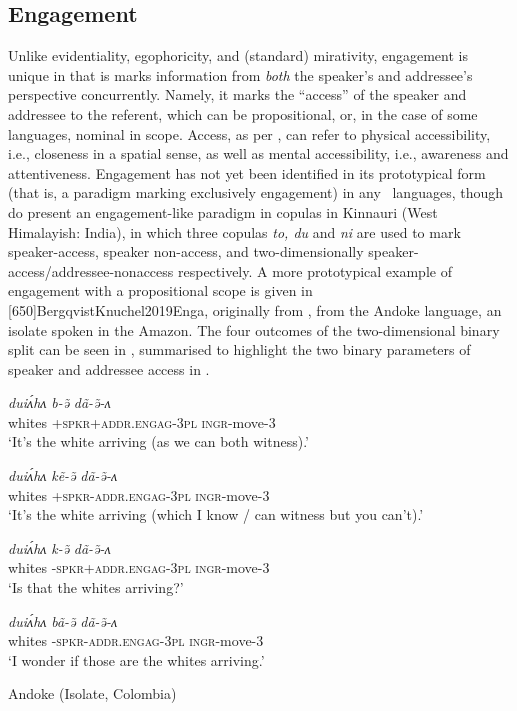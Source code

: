 \subsection{Engagement}\label{s:Intro:EngagementIntro}
Unlike evidentiality, egophoricity, and (standard) mirativity, engagement is unique in that is marks information from \textit{both} the speaker's and addressee's perspective concurrently. Namely, it marks the ``access'' \cite[118]{EvansBergqvistSanRoque2018a} of the speaker and addressee to the referent, which can be propositional, or, in the case of some languages, nominal in scope. Access, as per , can refer to physical accessibility, i.e., closeness in a spatial sense, as well as mental accessibility, i.e., awareness and attentiveness. Engagement has not yet been identified in its prototypical form (that is, a paradigm marking exclusively engagement) in any \lfam\ languages, though  do present an engagement-like paradigm in copulas in Kinnauri (West Himalayish: India), in which three copulas \textit{to, du} and \textit{ni} are used to mark speaker-access, speaker non-access, and two-dimensionally speaker-access/addressee-nonaccess respectively. A more prototypical example of engagement with a propositional scope is given in [650]{BergqvistKnuchel2019Enga}, originally from , from the Andoke language, an isolate spoken in the Amazon. The four outcomes of the two-dimensional binary split can be seen in , summarised to highlight the two binary parameters of speaker and addressee access in .

\begin{exe}
\ex\label{ex:EngagementIntro}
\begin{xlist}
\ex 
\gll \textit{duiʌ́hʌ} \textit{b-ə̃} \textit{dã-ə̃-ʌ} \\
whites \textsc{+spkr+addr.engag-3pl} \textsc{ingr}-move-3 \\
\glt `It's the white arriving (as we can both witness).'

\ex 
\gll \textit{duiʌ́hʌ} \textit{kẽ-ə̃} \textit{dã-ə̃-ʌ} \\
whites \textsc{+spkr-addr.engag-3pl} \textsc{ingr}-move-3 \\
\glt `It's the white arriving (which I know / can witness but you can't).'

\ex
\gll \textit{duiʌ́hʌ} \textit{k-ə̃} \textit{dã-ə̃-ʌ} \\
whites \textsc{-spkr+addr.engag-3pl} \textsc{ingr}-move-3 \\
\glt `Is that the whites arriving?'

\ex
\gll \textit{duiʌ́hʌ} \textit{bã-ə̃} \textit{dã-ə̃-ʌ} \\
whites \textsc{-spkr-addr.engag-3pl} \textsc{ingr}-move-3 \\
\glt `I wonder if those are the whites arriving.'

\end{xlist}
Andoke (Isolate, Colombia) \cite[115-116]{EvansBergqvistSanRoque2018a}
\end{exe}

